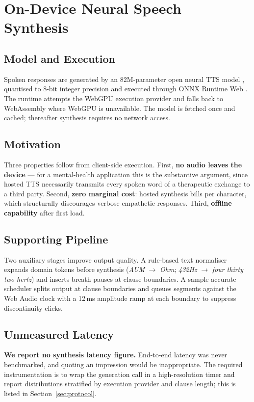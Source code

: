 \documentclass[conference]{IEEEtran}
\begin{document}
\section{On-Device Neural Speech Synthesis}
\label{sec:tts}

\subsection{Model and Execution}
Spoken responses are generated by an 82M-parameter open neural TTS model
\cite{kokoro}, quantised to 8-bit integer precision and executed through ONNX
Runtime Web \cite{onnxweb}. The runtime attempts the WebGPU execution provider
\cite{webgpu} and falls back to WebAssembly where WebGPU is unavailable. The
model is fetched once and cached; thereafter synthesis requires no network
access.

\subsection{Motivation}
Three properties follow from client-side execution. First, \textbf{no audio
leaves the device} --- for a mental-health application this is the substantive
argument, since hosted TTS necessarily transmits every spoken word of a
therapeutic exchange to a third party. Second, \textbf{zero marginal cost}:
hosted synthesis bills per character, which structurally discourages verbose
empathetic responses. Third, \textbf{offline capability} after first load.

\subsection{Supporting Pipeline}
Two auxiliary stages improve output quality. A rule-based text normaliser
expands domain tokens before synthesis (\textit{AUM} $\rightarrow$
\textit{Ohm}; \textit{432Hz} $\rightarrow$ \textit{four thirty two hertz}) and
inserts breath pauses at clause boundaries. A sample-accurate scheduler splits
output at clause boundaries and queues segments against the Web Audio clock
with a 12\,ms amplitude ramp at each boundary to suppress discontinuity clicks.

\subsection{Unmeasured Latency}
\textbf{We report no synthesis latency figure.} End-to-end latency was never
benchmarked, and quoting an impression would be inappropriate. The required
instrumentation is to wrap the generation call in a high-resolution timer and
report distributions stratified by execution provider and clause length; this
is listed in Section~\ref{sec:protocol}.
\end{document}

